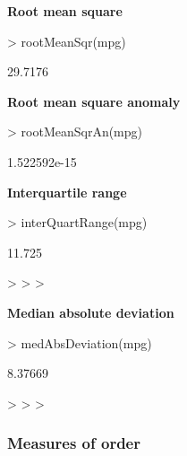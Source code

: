 \documentclass[a4paper]{article}
\begin{document}

\textbf{Root mean square}

\begin{Schunk}
\begin{Sinput}
> rootMeanSqr(mpg)
\end{Sinput}
\begin{Soutput}
[1] 29.7176
\end{Soutput}
\end{Schunk}



\textbf{Root mean square anomaly}

\begin{Schunk}
\begin{Sinput}
> rootMeanSqrAn(mpg)
\end{Sinput}
\begin{Soutput}
[1] 1.522592e-15
\end{Soutput}
\end{Schunk}

\textbf{Interquartile range}



\begin{Schunk}
\begin{Sinput}
> interQuartRange(mpg)
\end{Sinput}
\begin{Soutput}
[1] 11.725
\end{Soutput}
\begin{Sinput}
> 
> 
> 
\end{Sinput}
\end{Schunk}



\textbf{Median absolute deviation}

\begin{Schunk}
\begin{Sinput}
> medAbsDeviation(mpg)
\end{Sinput}
\begin{Soutput}
[1] 8.37669
\end{Soutput}
\begin{Sinput}
> 
> 
> 
\end{Sinput}
\end{Schunk}


\subsubsection*{Measures of order}
\end{document}
